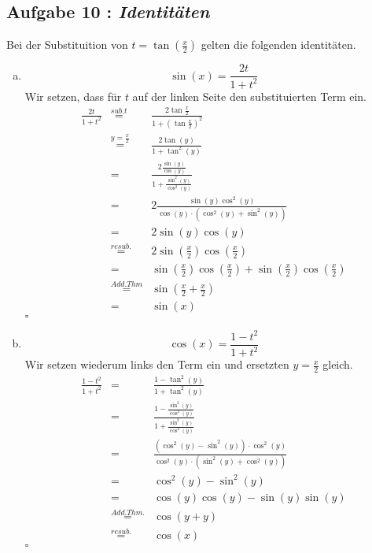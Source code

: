 \documentclass[11pt,a4paper,ngerman]{article}
\begin{document}
\subsection*{Aufgabe 10 : \mdseries\itshape Identitäten}

Bei der Substituition von $t = \tan \left(\frac{x}{2} \right)$ gelten die folgenden
identitäten.

\begin{enumerate}[a.]
    \addtocounter{enumi}{4}
    \item
        $$
            \sin (x) = \frac{2t}{1+t^2}
        $$
        Wir setzen, dass für $t$ auf der linken Seite den substituierten Term ein.
        $$\begin{array}{rcl}
            \frac{2t}{1+t^2} &\stackrel{sub. t}{=}& \frac{2\tan\frac{x}{2}}{1+(\tan \frac{x}{2})^2}\\
                &\stackrel{y=\frac{x}{2}}{=}&
                    \frac{2\tan (y)}{1+\tan^2 (y)}\\
                &=& \frac{2 \frac{\sin(y)}{\cos(y)}}{1+ \frac{\sin^2(y)}{\cos^2 (y)}}\\
                &=& 2\frac{\sin (y) \cos^2 (y)}{\cos(y) \cdot (\cos^2(y) + \sin^2(y))}\\
                &=& 2 \sin(y)\cos(y)\\
                &\stackrel{resub.}{=}& 2 \sin(\frac{x}{2})\cos(\frac{x}{2})\\
                &=& \sin(\frac{x}{2})\cos(\frac{x}{2}) + \sin(\frac{x}{2})\cos(\frac{x}{2})\\
                &\stackrel{Add.Thm}{=}& \sin(\frac{x}{2} + \frac{x}{2})\\
                &=& \sin(x)
        \end{array}$$
        \mbox{}\hfill $\square$
    \item
        $$
            \cos (x) = \frac{1-t^2}{1+t^2}
        $$
        Wir setzen wiederum links den Term ein und ersetzten $y=\frac{x}{2}$ gleich.\\
        $$\begin{array}{rcl}
            \frac{1-t^2}{1+t^2} &=& \frac{1- \tan^2(y)}{1+\tan^2(y)}\\
                &=& \frac{1-\frac{\sin^2(y)}{\cos^2(y)}}{1+\frac{\sin^2(y)}{\cos^2(y)}}\\
                &=& \frac{(\cos^2(y)-\sin^2(y)) \cdot \cos^2(y)}{\cos^2(y) \cdot (\sin^2(y) + \cos^2(y))}\\
                &=& \cos^2(y) - \sin^2(y)\\
                &=& \cos(y)\cos(y) - \sin(y)\sin(y)\\
                &\stackrel{Add.Thm.}{=}& \cos( y + y)\\
                &\stackrel{resub.}{=}& \cos(x)
        \end{array}$$
        \mbox{} \hfill $\square$

\end{enumerate}
        
\end{document}

